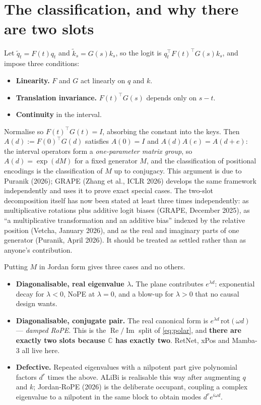 \documentclass[11pt]{article}
\newcommand{\C}{\mathbb{C}}
\begin{document}
\section{The classification, and why there are two slots}
\label{sec:classification}

Let $\tilde q_t = F(t)q_t$ and $\tilde k_s = G(s)k_s$, so the logit is
$q_t^\top F(t)^\top G(s) k_s$, and impose three conditions:

\begin{itemize}\itemsep2pt
\item \textbf{Linearity.} $F$ and $G$ act linearly on $q$ and $k$.
\item \textbf{Translation invariance.} $F(t)^\top G(s)$ depends only on $s-t$.
\item \textbf{Continuity} in the interval.
\end{itemize}

\noindent Normalise so $F(t)^\top G(t) = I$, absorbing the constant into the keys.
Then $A(d) := F(0)^\top G(d)$ satisfies $A(0) = I$ and $A(d)A(e) = A(d+e)$: the
interval operators form a \emph{one-parameter matrix group}, so $A(d) = \exp(dM)$
for a fixed generator $M$, and the classification of positional encodings is the
classification of $M$ up to conjugacy. This argument is due to
Puranik (2026); GRAPE (Zhang et al., ICLR 2026) develops the same framework
independently and uses it to prove exact special cases. The two-slot decomposition
itself has now been stated at least three times independently: as multiplicative
rotations plus additive logit biases (GRAPE, December 2025), as ``a multiplicative
transformation and an additive bias'' indexed by the relative position
(Vetcha, January 2026), and as the real and imaginary parts of one generator
(Puranik, April 2026). It should be treated as settled rather than as anyone's
contribution.

Putting $M$ in Jordan form gives three cases and no others.

\begin{itemize}\itemsep3pt
\item \textbf{Diagonalisable, real eigenvalue $\lambda$.} The plane contributes
  $e^{\lambda d}$: exponential decay for $\lambda<0$, NoPE at $\lambda=0$, and a
  blow-up for $\lambda>0$ that no causal design wants.
\item \textbf{Diagonalisable, conjugate pair.} The real canonical form is
  $e^{\lambda d}\,\mathrm{rot}(\omega d)$ --- \emph{damped RoPE}. This is the
  $\operatorname{Re}/\operatorname{Im}$ split of \eqref{eq:polar}, and
  \textbf{there are exactly two slots because $\C$ has exactly two}. RetNet, xPos
  and Mamba-3 all live here.
\item \textbf{Defective.} Repeated eigenvalues with a nilpotent part give
  polynomial factors $d^r$ times the above. ALiBi is realisable this way after
  augmenting $q$ and $k$; Jordan-RoPE (2026) is the deliberate occupant, coupling a
  complex eigenvalue to a nilpotent in the same block to obtain modes
  $d^r e^{i\omega d}$.
\end{itemize}
\end{document}
